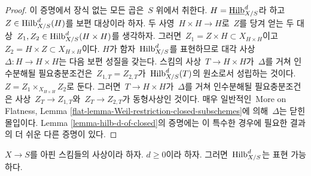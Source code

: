 \begin{proof}
이 증명에서 장식 없는 모든 곱은\  $S$ 위에서 취한다.
$H = \underline{\mathrm{Hilb}}^d_{X/S}$라 하고\ 
$Z \in \mathrm{Hilb}^d_{X/S}(H)$를 보편 대상이라 하자. 두 사영\ 
$H \times H \to H$로\  $Z$를 당겨 얻는 두 대상\ 
$Z_1, Z_2 \in \mathrm{Hilb}^d_{X/S}(H \times H)$를 생각하자.
그러면\  $Z_1 = Z \times H \subset X_{H \times H}$이고\ 
$Z_2 = H \times Z
\subset X_{H \times H}$이다. $H$가 함자\ 
$\mathrm{Hilb}^d_{X/S}$를 표현하므로 대각 사상\ 
$\Delta : H \to H \times H$는 다음 보편 성질을 갖는다. 스킴의 사상\ 
$T \to H \times H$가\  $\Delta$를 거쳐 인수분해될 필요충분조건은\ 
$Z_{1, T} = Z_{2, T}$가\  $\mathrm{Hilb}^d_{X/S}(T)$의 원소로서 성립하는
것이다. $Z = Z_1 \times_{X_{H \times H}} Z_2$로 둔다. 그러면\ 
$T \to H \times H$가\  $\Delta$를 거쳐 인수분해될 필요충분조건은
사상\  $Z_T \to Z_{1, T}$와\  $Z_T \to Z_{2, T}$가 동형사상인 것이다.
매우 일반적인\  More on Flatness, Lemma
\ref{flat-lemma-Weil-restriction-closed-subschemes}에 의해\  $\Delta$는
닫힌 몰입이다. Lemma \ref{lemma-hilb-d-of-closed}의 증명에는 이 특수한
경우에 필요한 결과의 더 쉬운 다른 증명이 있다.
\end{proof}

\begin{lemma}
\label{lemma-hilb-d-An}
$X \to S$를 아핀 스킴들의 사상이라 하자. $d \geq 0$이라 하자.
그러면\  $\mathrm{Hilb}^d_{X/S}$는 표현 가능하다.
\end{lemma}

